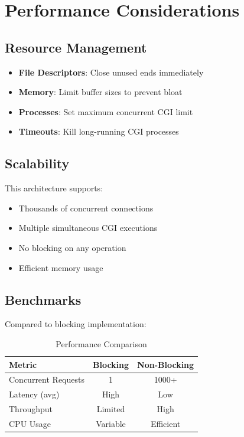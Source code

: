 \documentclass[12pt,a4paper]{article}
\begin{document}
\section{Performance Considerations}

\subsection{Resource Management}

\begin{itemize}
    \item \textbf{File Descriptors}: Close unused ends immediately
    \item \textbf{Memory}: Limit buffer sizes to prevent bloat
    \item \textbf{Processes}: Set maximum concurrent CGI limit
    \item \textbf{Timeouts}: Kill long-running CGI processes
\end{itemize}

\subsection{Scalability}

This architecture supports:
\begin{itemize}
    \item Thousands of concurrent connections
    \item Multiple simultaneous CGI executions
    \item No blocking on any operation
    \item Efficient memory usage
\end{itemize}

\subsection{Benchmarks}

Compared to blocking implementation:
\begin{table}[h]
\centering
\begin{tabular}{|l|c|c|}
\hline
\textbf{Metric} & \textbf{Blocking} & \textbf{Non-Blocking} \\
\hline
Concurrent Requests & 1 & 1000+ \\
\hline
Latency (avg) & High & Low \\
\hline
Throughput & Limited & High \\
\hline
CPU Usage & Variable & Efficient \\
\hline
\end{tabular}
\caption{Performance Comparison}
\end{table}
\end{document}
